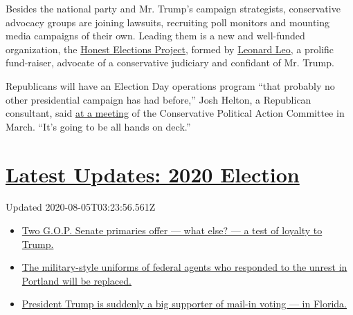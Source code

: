 Besides the national party and Mr. Trump's campaign strategists,
conservative advocacy groups are joining lawsuits, recruiting poll
monitors and mounting media campaigns of their own. Leading them is a
new and well-funded organization, the
\href{https://www.honestelections.org/}{Honest Elections Project},
formed by
\href{https://www.washingtonpost.com/graphics/2019/investigations/leonard-leo-federalists-society-courts/}{Leonard
Leo}, a prolific fund-raiser, advocate of a conservative judiciary and
confidant of Mr. Trump.

Republicans will have an Election Day operations program ``that probably
no other presidential campaign has had before,'' Josh Helton, a
Republican consultant, said
\href{https://cpac.conservative.org/protecting-the-ballot-box-defeating-the-lefts-voter-fraud-machine/}{at
a meeting} of the Conservative Political Action Committee in March.
``It's going to be all hands on deck.''

\hypertarget{latest-updates-2020-election}{%
\section{\texorpdfstring{\href{https://www.nytimes.com/2020/08/04/us/elections/primary-election-michigan-arizona-kansas.html?action=click\&pgtype=Article\&state=default\&region=MAIN_CONTENT_1\&context=storylines_live_updates}{Latest
Updates: 2020
Election}}{Latest Updates: 2020 Election}}\label{latest-updates-2020-election}}

Updated 2020-08-05T03:23:56.561Z

\begin{itemize}
\tightlist
\item
  \href{https://www.nytimes.com/2020/08/04/us/elections/primary-election-michigan-arizona-kansas.html?action=click\&pgtype=Article\&state=default\&region=MAIN_CONTENT_1\&context=storylines_live_updates\#link-3924dd44}{Two
  G.O.P. Senate primaries offer --- what else? --- a test of loyalty to
  Trump.}
\item
  \href{https://www.nytimes.com/2020/08/04/us/elections/primary-election-michigan-arizona-kansas.html?action=click\&pgtype=Article\&state=default\&region=MAIN_CONTENT_1\&context=storylines_live_updates\#link-62a8e06b}{The
  military-style uniforms of federal agents who responded to the unrest
  in Portland will be replaced.}
\item
  \href{https://www.nytimes.com/2020/08/04/us/elections/primary-election-michigan-arizona-kansas.html?action=click\&pgtype=Article\&state=default\&region=MAIN_CONTENT_1\&context=storylines_live_updates\#link-32b39e33}{President
  Trump is suddenly a big supporter of mail-in voting --- in Florida.}
\end{itemize}


